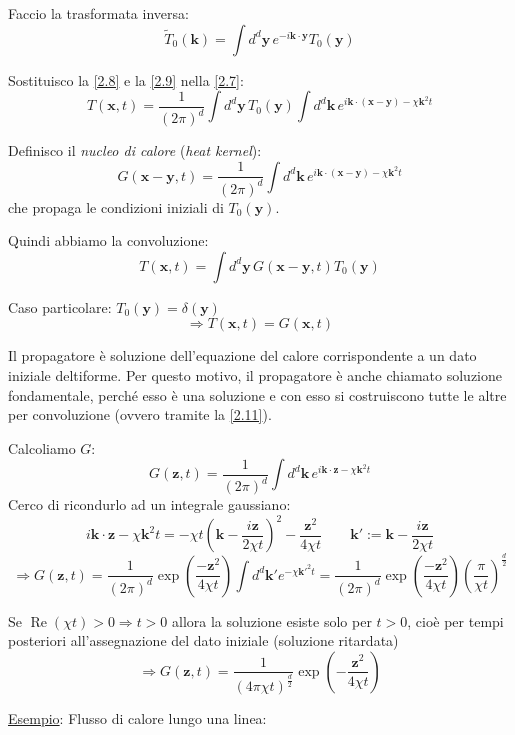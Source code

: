 \documentclass[a4paper,11pt]{report}
\newcommand{\x}{\boldsymbol{x}}
\newcommand{\y}{\boldsymbol{y}}
\newcommand{\kk}{\boldsymbol{k}}
\newcommand{\z}{\boldsymbol{z}}
\begin{document}
Faccio la trasformata inversa:
\begin{equation}
\tilde{T}_0(\kk)=\int d^d \y\, e^{-i\kk\cdot\y} T_0(\y) 
\label{2.9}
\end{equation}

Sostituisco la \eqref{2.8} e la \eqref{2.9} nella \eqref{2.7}:
\[
T(\x,t)=\frac{1}{(2\pi)^d}\int d^d \y\, T_0(\y)\int d^d\kk\, e^{i\kk\cdot(\x-\y)-\chi\kk^2 t}
\]

Definisco il \emph{nucleo di calore} (\emph{heat kernel}):
\begin{equation}
G(\x-\y,t) = \frac{1}{(2\pi)^d} \int d^d \kk \, e^{i\kk\cdot(\x-\y)-\chi\kk^2 t}
\end{equation}
che propaga le condizioni iniziali di $T_0(\y)$.

Quindi abbiamo la convoluzione:
\begin{equation}
T(\x,t)=\int d^d \y\, G(\x-\y,t)T_0(\y)
\label{2.11}
\end{equation}

Caso particolare: $T_0(\y)=\delta(\y)$
\[
\Rightarrow T(\x,t)=G(\x,t)
\]

Il propagatore \`e soluzione dell'equazione del calore corrispondente a un dato iniziale deltiforme. Per questo motivo, il propagatore \`e anche chiamato soluzione fondamentale, perch\'e esso \`e una soluzione e con esso si costruiscono tutte le altre per convoluzione (ovvero tramite la \eqref{2.11}).

\medskip

Calcoliamo $G$:
\[
G(\z,t)=\frac{1}{(2\pi)^d}\int d^d \kk\, e^{i\kk\cdot \z-\chi \kk^2 t}
\]
Cerco di ricondurlo ad un integrale gaussiano:
\[
i\kk\cdot \z-\chi \kk^2 t =-\chi t \left(\kk-\frac{i \z}{2 \chi t} \right)^2 - \frac{\z^2}{4\chi t} \qquad  \kk':=\kk-\frac{i\z}{2\chi t}
\]
\[
\Rightarrow G(\z,t)=\frac{1}{(2\pi)^d}\exp\left(\frac{-\z^2}{4\chi t}\right)\int d^d \kk' e^{-\chi\kk'^2 t}=\frac{1}{(2\pi)^d}\exp\left(\frac{-\z^2}{4\chi t}\right)\left(\frac{\pi}{\chi t}\right)^\frac{d}{2}
\]

Se $\operatorname{Re}(\chi t)>0\Rightarrow t>0$ allora la soluzione esiste solo per $t>0$, cio\`e per tempi posteriori all'assegnazione del dato iniziale (soluzione ritardata)
\begin{equation}
\Rightarrow G(\z,t)=\frac{1}{(4\pi\chi t)^{\frac{d}{2}}}\exp\left(-\frac{\z^2}{4\chi t}\right)
\label{2.12}
\end{equation}

\medskip

\underline{Esempio}: Flusso di calore lungo una linea:
\end{document}

